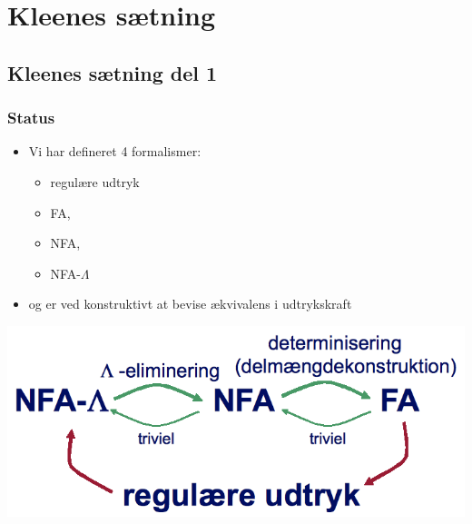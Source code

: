 \section{Kleenes sætning}
\subsection{Kleenes sætning del 1}
\begin{frame}
\frametitle{Status}
\begin{itemize}[<+->]
\item Vi har defineret 4 formalismer:
\begin{itemize}
\item regulære udtryk
\item FA,
\item NFA,
\item NFA-$\Lambda$
\end{itemize}
\item og er ved konstruktivt at bevise ækvivalens i udtrykskraft
\end{itemize}
\includegraphics[scale=0.4]{images/2_seminar_equiv}
\end{frame}

